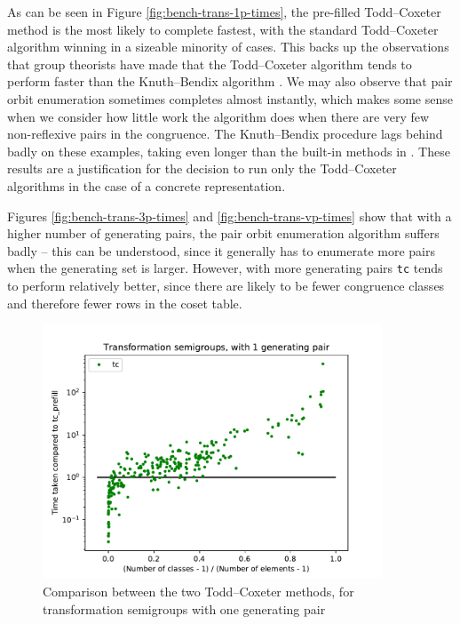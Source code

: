 As can be seen in Figure \ref{fig:bench-trans-1p-times}, the pre-filled
Todd--Coxeter method is the most likely to complete fastest, with the standard
Todd--Coxeter algorithm winning in a sizeable minority of cases.  This backs up the
observations that group theorists have made that the Todd--Coxeter algorithm tends to perform
faster than the Knuth--Bendix algorithm \cite{havascomparing}.  We may also observe that pair
orbit enumeration sometimes completes almost instantly, which makes some sense
when we consider how little work the algorithm does when there are very few
non-reflexive pairs in the congruence.  The Knuth--Bendix procedure lags behind
badly on these examples, taking even longer than the built-in methods in \GAP{}.
These results are a justification for the decision to run only the Todd--Coxeter
algorithms in the case of a concrete representation.

Figures \ref{fig:bench-trans-3p-times} and \ref{fig:bench-trans-vp-times} show
that with a higher number of generating pairs, the pair orbit enumeration
algorithm suffers badly -- this can be understood, since it generally has to
enumerate more pairs when the generating set is larger.  However, with more
generating pairs \texttt{tc} tends to perform relatively better, since there are
likely to be fewer congruence classes and therefore fewer rows in the coset
table.

\begin{figure}[p]
  \centering
  \includegraphics[width=0.9\textwidth]{pics/ch-pairs/bench-trans-tc-1p-tccomp}
  \caption[Benchmark: Todd--Coxeter, concrete, 1 pair]
  {Comparison between the two Todd--Coxeter methods, for transformation
    semigroups with one generating pair}
  \label{fig:bench-trans-tc-1p-tccomp}
\end{figure}

